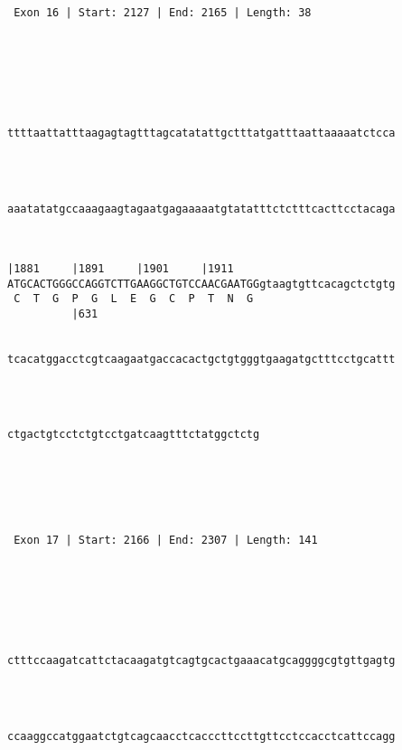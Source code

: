 \documentclass{article}
\begin{document}
\begin{Verbatim}
 Exon 16 | Start: 2127 | End: 2165 | Length: 38 





   
                                                            
ttttaattatttaagagtagtttagcatatattgctttatgatttaattaaaaatctcca
                                                            
                                                            
   
                                                            
aaatatatgccaaagaagtagaatgagaaaaatgtatatttctctttcacttcctacaga
                                                            
                                                            
   
|1881     |1891     |1901     |1911                         
ATGCACTGGGCCAGGTCTTGAAGGCTGTCCAACGAATGGgtaagtgttcacagctctgtg
 C  T  G  P  G  L  E  G  C  P  T  N  G                      
          |631                                              
   
                                                            
tcacatggacctcgtcaagaatgaccacactgctgtgggtgaagatgctttcctgcattt
                                                            
                                                            
   
                                       
ctgactgtcctctgtcctgatcaagtttctatggctctg
                                       
                                       
  



 Exon 17 | Start: 2166 | End: 2307 | Length: 141 





   
                                                            
ctttccaagatcattctacaagatgtcagtgcactgaaacatgcaggggcgtgttgagtg
                                                            
                                                            
   
                                                            
ccaaggccatggaatctgtcagcaacctcacccttccttgttcctccacctcattccagg
                                                            
                                                            
   

\end{Verbatim}
\end{document}

